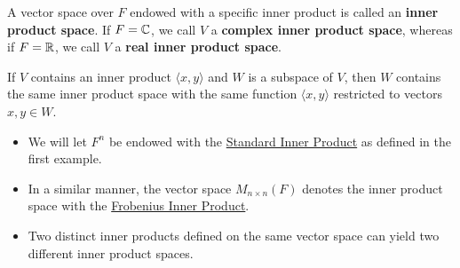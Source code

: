 \begin{definition}
A vector space over \( F  \) endowed with a specific inner product is called an \textbf{inner product space}. If \( F = \mathbb{C}  \), we call \( V  \) a \textbf{complex inner product space}, whereas if \( F = \mathbb{R}  \), we call \( V  \) a \textbf{real inner product space}.    
\end{definition}

\begin{remark}
    If \( V  \) contains an inner product \( \langle x,y \rangle \) and \( W  \) is a subspace of \( V  \), then \( W  \) contains the same inner product space with the same function \( \langle x,y \rangle \) restricted to vectors \( x,y \in W  \).
\end{remark}

\begin{itemize}
    \item We will let \( F^{n} \) be endowed with the {\hyperref[Standard Inner Product]{Standard Inner Product}} as defined in the first example.
    \item In a similar manner, the vector space \( {M}_{n \times n}(F) \) denotes the inner product space with the {\hyperref[Frobenius Inner Product]{Frobenius Inner Product}}. 
    \item Two distinct inner products defined on the same vector space can yield two different inner product spaces.
\end{itemize}

